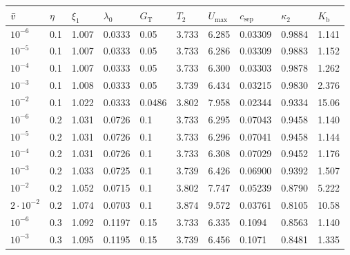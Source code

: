 \begin{table}[ht]
\centering
{\small\setlength\tabcolsep{4pt}
\begin{tabular}{@{}ll|lll|lllll@{}}
\toprule
$\bar v$&$\eta$&$\xi_1$&$\lambda_0$&$G_{\mathrm T}$&$T_2$&$U_{\max}$&$c_{\mathrm{sep}}$&$\kappa_2$&$K_{\mathrm b}$\\
\midrule
$10^{-6}$&0.1&1.007&0.0333&0.05&3.733&6.285&0.03309&0.9884&1.141\\
$10^{-5}$&0.1&1.007&0.0333&0.05&3.733&6.286&0.03309&0.9883&1.152\\
$10^{-4}$&0.1&1.007&0.0333&0.05&3.733&6.300&0.03303&0.9878&1.262\\
$10^{-3}$&0.1&1.008&0.0333&0.05&3.739&6.434&0.03215&0.9830&2.376\\
$10^{-2}$&0.1&1.022&0.0333&0.0486&3.802&7.958&0.02344&0.9334&15.06\\
$10^{-6}$&0.2&1.031&0.0726&0.1&3.733&6.295&0.07043&0.9458&1.140\\
$10^{-5}$&0.2&1.031&0.0726&0.1&3.733&6.296&0.07041&0.9458&1.144\\
$10^{-4}$&0.2&1.031&0.0726&0.1&3.733&6.308&0.07029&0.9452&1.176\\
$10^{-3}$&0.2&1.033&0.0725&0.1&3.739&6.426&0.06900&0.9392&1.507\\
$10^{-2}$&0.2&1.052&0.0715&0.1&3.802&7.747&0.05239&0.8790&5.222\\
$2\cdot10^{-2}$&0.2&1.074&0.0703&0.1&3.874&9.572&0.03761&0.8105&10.58\\
$10^{-6}$&0.3&1.092&0.1197&0.15&3.733&6.335&0.1094&0.8563&1.140\\
$10^{-3}$&0.3&1.095&0.1195&0.15&3.739&6.456&0.1071&0.8481&1.335\\
\bottomrule
\end{tabular}

}
\end{table}

